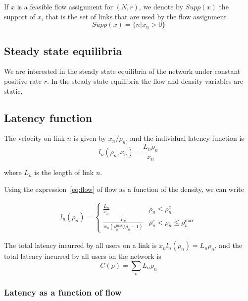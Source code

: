 If $x$ is a feasible flow assignment for $(N, r)$, we denote by $Supp(x)$ the support of $x$, that is the set of links that are used by the flow assignment
\[
Supp(x) = \{ n | x_n >0 \}
\]

\subsection{Steady state equilibria}
We are interested in the steady state equilibria of the network under constant positive rate $r$. In the steady state equilibria the flow and density variables are static.


\subsection{Latency function}
The velocity on link $n$ is given by $x_n/\rho_n$, and the individual latency function is
\[
l_n(\rho_n, x_n) = \frac{L_n\rho_n}{x_n} 
\]

where $L_n$ is the length of link $n$.

Using the expression~\ref{eq:flow} of flow as a function of the density, we can write

\begin{align*}
l_n(\rho_n) = 
\begin{cases}
\frac{L_n}{ v_n} & \rho_n \leq \rho_n^c\\
\frac{L_n}{ w_n(\rho_n^{\max}/\rho_n - 1)} & \rho_n^c < \rho_n \leq \rho_n^{\max}
\end{cases}
\end{align*}

The total latency incurred by all users on a link is $x_n l_n(\rho_n) = L_n \rho_n$, and the total latency incurred by all users on the network is
\begin{equation}
\label{eq:cost_function}
C(\rho) = \sum_n L_n \rho_n
\end{equation}


\subsubsection{Latency as a function of flow}

